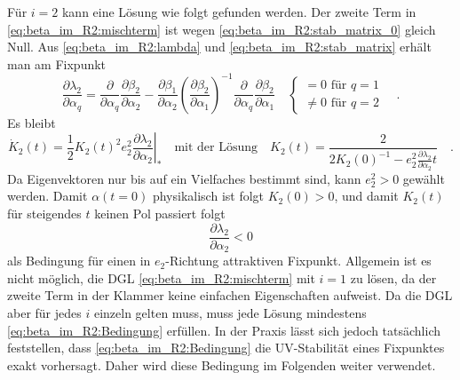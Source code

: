     Für $i=2$ kann eine Lösung wie folgt gefunden werden. Der zweite Term in 
    \eqref{eq:beta_im_R2:mischterm} ist wegen 
    \eqref{eq:beta_im_R2:stab_matrix_0} gleich Null.
    Aus \eqref{eq:beta_im_R2:lambda} und \eqref{eq:beta_im_R2:stab_matrix} 
    erhält man am Fixpunkt
    \begin{equation}
     \frac{\partial \lambda_2}{\partial \alpha_q} = 
     \frac{\partial}{\partial \alpha_q} 
     \frac{\partial \beta_2}{\partial \alpha_2} -
     \frac{\partial \beta_1}{\partial \alpha_2} 
     \left(\frac{\partial \beta_2}{\partial \alpha_1} \right)^{-1}
     \frac{\partial}{\partial \alpha_q} 
     \frac{\partial \beta_2}{\partial \alpha_1} \quad 
         \begin{cases}
     =0 \text{ für }q=1\\
     \neq 0 \text{ für }q=2 
   \end{cases}
   \quad .
    \end{equation}
    Es bleibt 
    \begin{equation}
     \dot{K}_2(t) =\frac12 K_2(t)^2  e_2^2 
     \left. \frac{\partial \lambda_2}{\partial \alpha_2} \right|_* \quad 
   \text{mit der Lösung} \quad 
     K_2(t) = \frac{2}{2 K_2(0)^{-1} - 
     e_2^2 \frac{\partial \lambda_2}{\partial \alpha_2}t } \quad .
    \end{equation}
    Da Eigenvektoren nur bis auf ein Vielfaches bestimmt sind, kann 
    $e_2^2>0$ gewählt werden. Damit $\alpha(t=0)$ physikalisch ist folgt 
    $K_2(0)>0$, und damit $K_2(t)$ für steigendes $t$ keinen Pol passiert folgt 
    \begin{equation}
     \frac{\partial \lambda_2}{\partial \alpha_2} < 0
     \label{eq:beta_im_R2:Bedingung}
    \end{equation}
    als Bedingung für einen in $e_2$-Richtung attraktiven Fixpunkt.
    Allgemein ist es nicht möglich, die DGL \eqref{eq:beta_im_R2:mischterm} 
    mit $i=1$ zu lösen, da der zweite Term in der Klammer keine einfachen Eigenschaften 
    aufweist. Da die DGL aber für jedes $i$ einzeln gelten muss, muss jede 
    Lösung mindestens \eqref{eq:beta_im_R2:Bedingung} erfüllen. In der Praxis 
    lässt sich jedoch tatsächlich feststellen, dass 
    \eqref{eq:beta_im_R2:Bedingung} die UV-Stabilität eines Fixpunktes exakt 
    vorhersagt. Daher wird diese Bedingung im Folgenden weiter verwendet.

 